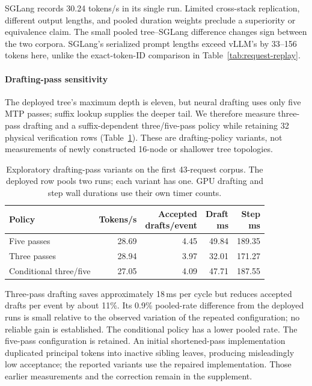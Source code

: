 SGLang records 30.24 tokens/s in its single run. Limited cross-stack replication, different output lengths, and pooled duration weights preclude a superiority or equivalence claim. The small pooled tree--SGLang difference changes sign between the two corpora. SGLang's serialized prompt lengths exceed vLLM's by 33--156 tokens here, unlike the exact-token-ID comparison in Table~\ref{tab:request-replay}.

\paragraph{Drafting-pass sensitivity}
The deployed tree's maximum depth is eleven, but neural drafting uses only five MTP passes; suffix lookup supplies the deeper tail. We therefore measure three-pass drafting and a suffix-dependent three/five-pass policy while retaining 32 physical verification rows (Table~\ref{tab:drafting-passes}). These are drafting-policy variants, not measurements of newly constructed 16-node or shallower tree topologies.

\begin{table}[t]
\caption{Exploratory drafting-pass variants on the first 43-request corpus. The deployed row pools two runs; each variant has one. GPU drafting and step wall durations use their own timer counts.}
\label{tab:drafting-passes}
\centering\small
\setlength{\tabcolsep}{3pt}
\begin{tabular}{@{}lrrrr@{}}
\toprule
Policy & Tokens/s & \shortstack{Accepted\\drafts/event} & \shortstack{Draft\\ms} & \shortstack{Step\\ms} \\
\midrule
Five passes & 28.69 & 4.45 & 49.84 & 189.35 \\
Three passes & 28.94 & 3.97 & 32.01 & 171.27 \\
Conditional three/five & 27.05 & 4.09 & 47.71 & 187.55 \\
\bottomrule
\end{tabular}
\end{table}

Three-pass drafting saves approximately 18\,ms per cycle but reduces accepted drafts per event by about 11\%. Its 0.9\% pooled-rate difference from the deployed runs is small relative to the observed variation of the repeated configuration; no reliable gain is established. The conditional policy has a lower pooled rate. The five-pass configuration is retained. An initial shortened-pass implementation duplicated principal tokens into inactive sibling leaves, producing misleadingly low acceptance; the reported variants use the repaired implementation. Those earlier measurements and the correction remain in the supplement.
